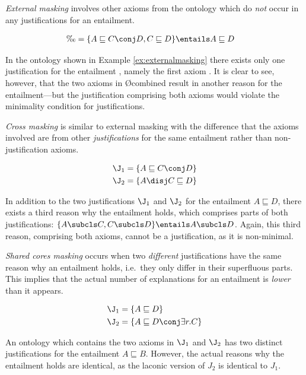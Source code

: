 \emph{External masking} involves other axioms from the ontology which do \emph{not} occur in any justifications for an entailment. 
\begin{examp}\begin{align*}
\O &=  \{ A \sqsubseteq C \conj  D, C  \sqsubseteq D\} \entails A \sqsubseteq D
\end{align*}\label{ex:externalmasking}\end{examp}
In the ontology shown in Example \ref{ex:externalmasking} there exists only one justification for the entailment , namely the first axiom . It is clear to see, however, that the two axioms in \O combined result in another reason for the entailment---but the justification comprising both axioms would violate the minimality condition for justifications.

\emph{Cross masking} is similar to external masking with the difference that the axioms involved are from other \emph{justifications} for the same entailment rather than non-justification axioms.
\begin{examp}\begin{align*}
\J_{1} &=  \{ A \sqsubseteq C \conj D \}\\ 
\J_{2} &=  \{ A \disj C \sqsubseteq D\}
\end{align*}\label{ex:crossmasking}\end{examp}%
In addition to the two justifications $\J_{1}$ and $\J_{2}$ for the entailment $A \sqsubseteq D$, there exists a third reason why the entailment holds, which comprises parts of both justifications: $ \{ A \subcls C, C \subcls D\} \entails A \subcls D$. Again, this third reason,  comprising both axioms, cannot be a justification, as it is non-minimal.

\emph{Shared cores masking} occurs when two \emph{different} justifications have the same reason why an entailment holds, i.e.\ they only differ in their superfluous parts. This implies that the actual number of explanations for an entailment is \emph{lower} than it appears.
\begin{examp}\begin{align*}
\J_{1} &=  \{ A \sqsubseteq D\}\\ 
\J_{2} &=  \{ A \sqsubseteq D \conj \exists r.C\}
\end{align*}\end{examp}
An ontology which contains the two axioms in $\J_{1}$ and $\J_{2}$ has two distinct justifications for the entailment $A \sqsubseteq B$. However, the actual reasons why the entailment holds are identical, as the laconic version of $J_{2}$ is identical to $J_{1}$. 

